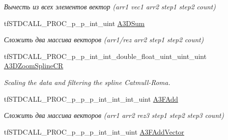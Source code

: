 \begin{DoxyCompactItemize}
\begin{DoxyCompactList}\small\item\em Вычесть из всех элементов вектор (arr1 vec1 arr2 step1 step2 count) \end{DoxyCompactList}\item 
\hypertarget{structs_functions_array_vector_c_p_u_a1c02dc20e3c367fcf66e023622526397}{tf\-S\-T\-D\-C\-A\-L\-L\-\_\-\-P\-R\-O\-C\-\_\-p\-\_\-p\-\_\-int\-\_\-uint \hyperlink{structs_functions_array_vector_c_p_u_a1c02dc20e3c367fcf66e023622526397}{A3\-D\-Sum}}\label{structs_functions_array_vector_c_p_u_a1c02dc20e3c367fcf66e023622526397}

\begin{DoxyCompactList}\small\item\em Сложить два массива векторов (arr1/rez arr2 step1 step2 count) \end{DoxyCompactList}\item 
\hypertarget{structs_functions_array_vector_c_p_u_a7ff8023f6970dfb30cfb5b70972593b6}{tf\-S\-T\-D\-C\-A\-L\-L\-\_\-\-P\-R\-O\-C\-\_\-p\-\_\-p\-\_\-int\-\_\-int\-\_\-double\-\_\-float\-\_\-uint\-\_\-uint\-\_\-uint \hyperlink{structs_functions_array_vector_c_p_u_a7ff8023f6970dfb30cfb5b70972593b6}{A3\-D\-Zoom\-Spline\-C\-R}}\label{structs_functions_array_vector_c_p_u_a7ff8023f6970dfb30cfb5b70972593b6}

\begin{DoxyCompactList}\small\item\em Scaling the data and filtering the spline Catmull-\/\-Roma. \end{DoxyCompactList}\item 
\hypertarget{structs_functions_array_vector_c_p_u_a82801f99df698928fbd0544129da6603}{tf\-S\-T\-D\-C\-A\-L\-L\-\_\-\-P\-R\-O\-C\-\_\-p\-\_\-p\-\_\-p\-\_\-int\-\_\-int\-\_\-int\-\_\-uint \hyperlink{structs_functions_array_vector_c_p_u_a82801f99df698928fbd0544129da6603}{A3\-F\-Add}}\label{structs_functions_array_vector_c_p_u_a82801f99df698928fbd0544129da6603}

\begin{DoxyCompactList}\small\item\em Сложить два массива векторов (arr1 arr2 rez3 step1 step2 step3 count) \end{DoxyCompactList}\item 
\hypertarget{structs_functions_array_vector_c_p_u_a3c1f5ad451e5247a3a887310aff353f9}{tf\-S\-T\-D\-C\-A\-L\-L\-\_\-\-P\-R\-O\-C\-\_\-p\-\_\-p\-\_\-p\-\_\-int\-\_\-int\-\_\-uint \hyperlink{structs_functions_array_vector_c_p_u_a3c1f5ad451e5247a3a887310aff353f9}{A3\-F\-Add\-Vector}}\label{structs_functions_array_vector_c_p_u_a3c1f5ad451e5247a3a887310aff353f9}


\end{DoxyCompactItemize}
